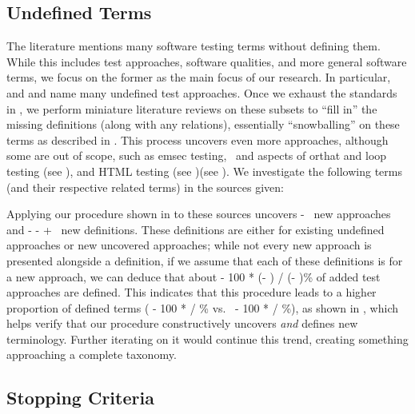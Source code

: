 \subsection{Undefined Terms}\label{undef-terms}

The literature mentions many software testing terms without defining them.
While this includes test approaches, software qualities, and more general
software terms, we focus on the former as the main focus of our research.
In particular, \ifnotpaper \citet{IEEE2022} and \citet{Firesmith2015} \else
    \cite{Firesmith2015} and \cite{IEEE2022} \fi name many undefined test
approaches. Once we exhaust the standards in , we
perform miniature literature reviews on these subsets to ``fill in'' the
missing definitions (along with any relations), essentially ``snowballing''
on these terms as described in . This process uncovers
even more approaches, although some are
out of scope, such as \acf{emsec} testing\ifnotpaper, \else\ and \fi
aspects of \acf{orthat} \ifnotpaper and loop testing (see ),
    and HTML testing (see )\else (see )\fi.
We investigate the following terms (and their respective related terms) in the
sources given:


\ifnotpaper
    Applying our procedure shown in  to these sources
    uncovers \the\numexpr \TotalAfter - \TotalBefore\relax\ new approaches and
    \the\numexpr \TotalAfter - \UndefAfter - \TotalBefore + \UndefBefore\relax\ new
    definitions. These definitions are either for existing undefined approaches or
    new uncovered approaches; while not every new approach is presented alongside
    a definition, if we assume that each of these definitions is for a new approach,
    we can deduce that about \the{} - 100 * (\UndefAfter - \UndefBefore) /
    (\TotalAfter - \TotalBefore)\relax\% of added test approaches are defined. This
    indicates that this procedure leads to a higher proportion of defined terms
    (\the{} - 100 * \UndefBefore / \TotalBefore\relax\% vs.~%
    \the{} - 100 * \UndefAfter / \TotalAfter\relax\%), as shown in
    , which helps verify that our procedure constructively
    uncovers \emph{and} defines new terminology. Further iterating on it would
    continue this trend, creating something approaching a complete taxonomy.

    
\fi

\subsection{Stopping Criteria}\label{stop-crit}

